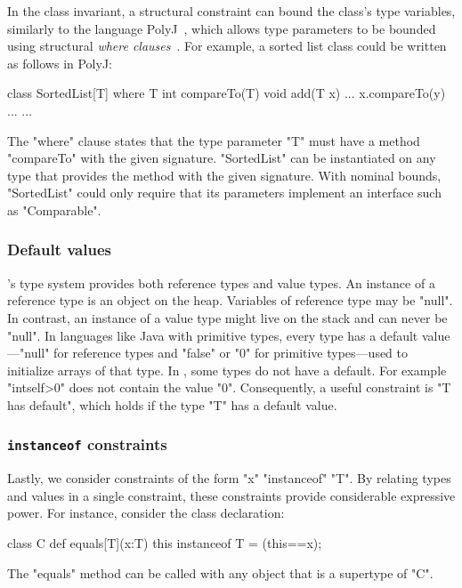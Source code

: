 In the class invariant, a structural constraint can bound the
class's type variables, similarly to 
the language PolyJ~\cite{java-popl97}, which allows type
parameters to be
bounded using
structural \emph{where clauses}~\cite{where-clauses}.
For example, a sorted list class
could be written as follows in PolyJ:
{
\begin{xtennoindent}
class SortedList[T]
    where T {int compareTo(T)} {
  void add(T x) {... x.compareTo(y) ...}
  ...
}
\end{xtennoindent}}
The \xcd"where" clause states that the type parameter
\xcd"T" must have a
method \xcd"compareTo" with the given signature.
\xcd"SortedList" can be instantiated on any type
that provides the method with the given signature.
With nominal bounds, \xcd"SortedList" could only require that
its parameters implement an interface such as \xcd"Comparable".

\subsubsection{Default values}

\Xten's type system provides both reference types and value
types.  An instance of a reference type is an object on the
heap.  Variables of reference type may be \xcd"null".
In contrast, an instance of a value type might live on the stack
and can never be \xcd"null".  In languages like Java with
primitive types, every type has a default value---\xcd"null" for
reference types and \xcd"false" or \xcd"0" for primitive
types---used to initialize arrays of that type.
In \Xten, some types do not have a default.  For example
\xcd"int{self>0}"  does not contain the value \xcd"0".
Consequently, a useful constraint is \xcd"T has default", which
holds if the type \xcd"T" has a default value.

\subsubsection{{\tt instanceof} constraints}

Lastly, we consider constraints of the form \xcd"x" \xcd"instanceof" \xcd"T".
By relating types and values in a single constraint, 
these constraints provide considerable expressive power.
For instance, 
consider the class declaration:
\begin{xtennoindent}
class C {
  def equals[T](x:T) {this instanceof T} = (this==x);
}
\end{xtennoindent}
The \xcd"equals" method can be called with any object
that is a supertype of \xcd"C".

